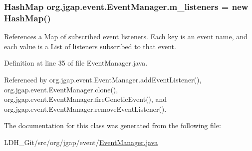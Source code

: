 \hypertarget{classorg_1_1jgap_1_1event_1_1_event_manager_a82f36c08bb38ac378babc9b6256f40ce}{
\subsubsection[{m\-\_\-listeners}]{\setlength{\rightskip}{0pt plus 5cm}Hash\-Map org.\-jgap.\-event.\-Event\-Manager.\-m\-\_\-listeners = new Hash\-Map()\hspace{0.3cm}{\ttfamily [private]}}}\label{classorg_1_1jgap_1_1event_1_1_event_manager_a82f36c08bb38ac378babc9b6256f40ce}
References a Map of subscribed event listeners. Each key is an event name, and each value is a List of listeners subscribed to that event. 

Definition at line 35 of file Event\-Manager.\-java.



Referenced by org.\-jgap.\-event.\-Event\-Manager.\-add\-Event\-Listener(), org.\-jgap.\-event.\-Event\-Manager.\-clone(), org.\-jgap.\-event.\-Event\-Manager.\-fire\-Genetic\-Event(), and org.\-jgap.\-event.\-Event\-Manager.\-remove\-Event\-Listener().



The documentation for this class was generated from the following file\-:\begin{DoxyCompactItemize}
\item 
L\-D\-H\-\_\-\-Git/src/org/jgap/event/\hyperlink{_event_manager_8java}{Event\-Manager.\-java}\end{DoxyCompactItemize}
